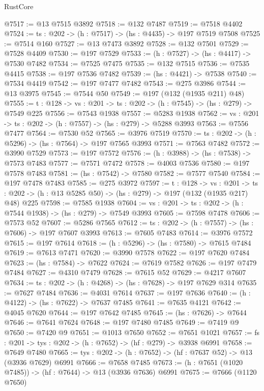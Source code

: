 \begin{lexlean}{RustCore}
\begin{coremodule}
@7517 := @13 @7515 @3892
@7518 := @132 @7487
@7519 := @7518 @4402
@7524 := {ts : @202} -> (h : @7517) -> (hs : @4435) -> @197 @7519 @7508
@7525 := @7514 @160
@7527 := @13 @7473 @3892
@7528 := @132 @7501
@7529 := @7528 @4409
@7530 := @197 @7529
@7533 := (h : @7527) -> (hs : @4417) -> @7530 @7482
@7534 := @7525 @7475
@7535 := @132 @7515
@7536 := @7535 @4415
@7538 := @197 @7536 @7482
@7539 := (hs : @4421) -> @7538
@7540 := @7534 @4419
@7542 := @197 @7477 @7482
@7543 := @275 @3986
@7544 := @13 @3975
@7545 := @7544 @50
@7549 := @197 (@132 (@1935 @211) @48)
@7555 := {t : @128} -> {vs : @201} -> {ts : @202} -> (h : @7545) -> (hs : @279) -> @7549 @225
@7556 := @7543 @1938
@7557 := @5283 @1938
@7562 := {vs : @201} -> {ts : @202} -> (h : @7557) -> (hs : @279) -> @5288 @3993
@7563 := @7556 @7477
@7564 := @7530 @52
@7565 := @3976 @7519
@7570 := {ts : @202} -> (h : @5296) -> (hs : @7564) -> @197 @7565 @3993
@7571 := @7563 @7482
@7572 := @3990 @7529
@7573 := @197 @7572
@7576 := (h : @3988) -> (hs : @7538) -> @7573 @7483
@7577 := @7571 @7472
@7578 := @4003 @7536
@7580 := @197 @7578 @7483
@7581 := (hs : @7542) -> @7580
@7582 := @7577 @7540
@7584 := @197 @7478 @7483
@7585 := @275 @3972
@7597 := {t : @128} ->
  {vs : @201} ->
  {ts : @202} -> (h : @13 @5285 @50) -> (hs : @279) -> @197 (@132 (@1935 @217) @48) @225
@7598 := @7585 @1938
@7604 := {vs : @201} -> {ts : @202} -> (h : @7544 @1938) -> (hs : @279) -> @7549 @3993
@7605 := @7598 @7478
@7606 := @7573 @52
@7607 := @5286 @7565
@7612 := {ts : @202} -> (h : @7557) -> (hs : @7606) -> @197 @7607 @3993
@7613 := @7605 @7483
@7614 := @3976 @7572
@7615 := @197 @7614
@7618 := (h : @5296) -> (hs : @7580) -> @7615 @7484
@7619 := @7613 @7471
@7620 := @3990 @7578
@7622 := @197 @7620 @7484
@7623 := (hs : @7584) -> @7622
@7624 := @7619 @7582
@7626 := @197 @7479 @7484
@7627 := @4310 @7479
@7628 := @7615 @52
@7629 := @4217 @7607
@7634 := {ts : @202} -> (h : @4268) -> (hs : @7628) -> @197 @7629 @314
@7635 := @7627 @7484
@7636 := @4031 @7614
@7637 := @197 @7636
@7640 := (h : @4122) -> (hs : @7622) -> @7637 @7485
@7641 := @7635 @4121
@7642 := @4045 @7620
@7644 := @197 @7642 @7485
@7645 := (hs : @7626) -> @7644
@7646 := @7641 @7624
@7648 := @197 @7480 @7485
@7649 := @7419 @9
@7650 := @7420 @9
@7651 := @1013 @7650
@7652 := @7651 @1021
@7657 := {fs : @201} -> {tys : @202} -> (h : @7652) -> (hf : @279) -> @3938 @6991
@7658 := @7649 @7480
@7665 := {tys : @202} -> (h : @7652) -> (hf : @7637 @52) -> @13 (@3936 @7629) @6991
@7666 := @7658 @7485
@7673 := (h : @7651 (@1020 @7485)) -> (hf : @7644) -> @13 (@3936 @7636) @6991
@7675 := @7666 (@1120 @7650)

\end{coremodule}
\end{lexlean}
